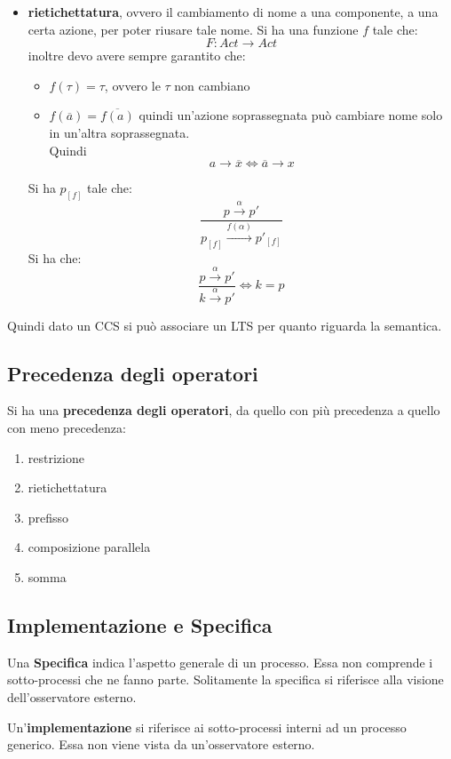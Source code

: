 \begin{itemize}
  \item \textbf{rietichettatura}, ovvero il cambiamento di nome a una
  componente, a una certa azione, per poter riusare tale nome. Si ha una
  funzione $f$ tale che:
  \[F:Act\to Act\]
  inoltre devo avere sempre garantito che:
  \begin{itemize}
    \item $f(\tau)=\tau$, ovvero le $\tau$ non cambiano
    \item $f(\overline{a})=\overline{f(a)}$ quindi un'azione soprassegnata può
    cambiare nome solo in un'altra soprassegnata. \\ Quindi \[a\to \overline{x} \iff \overline{a}\to x\]
  \end{itemize}
  Si ha $p_{[f]}$ tale che:
  \[\frac{p\stackrel{\alpha}{\rightarrow}p'}{p_{[f]}
      \stackrel{f(\alpha)}{\rightarrow}p'_{[f]}}\]
  Si ha che:
  \[\frac{p\stackrel{\alpha}{\rightarrow}p'}{k
      \stackrel{\alpha}{\rightarrow}p'}\iff k=p\]
\end{itemize}
Quindi dato un CCS si può associare un LTS per quanto riguarda la semantica.\\
\subsection{Precedenza degli operatori}
Si ha una \textbf{precedenza degli operatori}, da quello con più precedenza a
quello con meno precedenza: 
\begin{enumerate}
  \item restrizione
  \item rietichettatura
  \item prefisso
  \item composizione parallela
  \item somma
\end{enumerate}
\subsection{Implementazione e Specifica}
\begin{definizione}
  Una \textbf{Specifica} indica l'aspetto generale di un processo. Essa non comprende i sotto-processi che ne fanno parte. Solitamente la specifica si riferisce alla visione dell'osservatore esterno.
\end{definizione} \vspace{5mm} %
\begin{definizione}
  Un'\textbf{implementazione} si riferisce ai sotto-processi interni ad un processo generico. Essa non viene vista da un'osservatore esterno.
\end{definizione} \vspace{5mm} %
